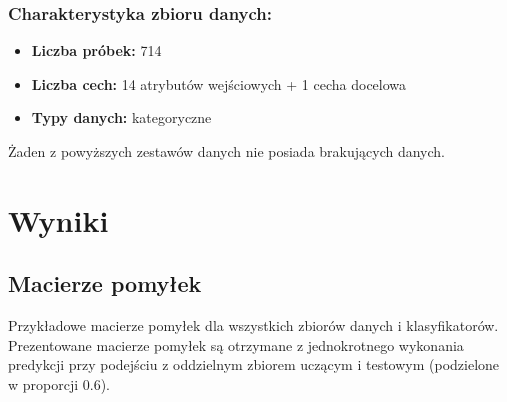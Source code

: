 \documentclass{article}
\begin{document}
\subsubsection*{Charakterystyka zbioru danych:}

\begin{itemize}
    \item \textbf{Liczba próbek:} 714
    \item \textbf{Liczba cech:} 14 atrybutów wejściowych + 1 cecha docelowa
    \item \textbf{Typy danych:} kategoryczne
\end{itemize}

Żaden z powyższych zestawów danych nie posiada brakujących danych.

\section{Wyniki}

\subsection{Macierze pomyłek}
Przykładowe macierze pomyłek dla wszystkich zbiorów danych i klasyfikatorów.
Prezentowane macierze pomyłek są otrzymane z jednokrotnego wykonania predykcji przy podejściu z oddzielnym zbiorem uczącym i testowym (podzielone w proporcji $0.6$).
\end{document}

